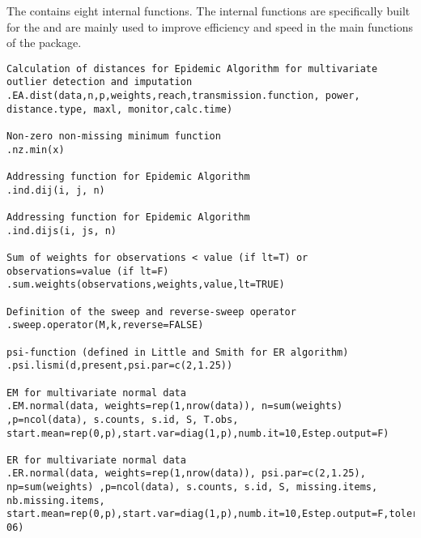 %
\begin{Description}\relax
The  contains eight internal functions. The internal functions are specifically built for the  and are mainly used to improve efficiency and speed in the main functions of the package.
\end{Description}
%
\begin{Usage}
\begin{verbatim}
Calculation of distances for Epidemic Algorithm for multivariate outlier detection and imputation
.EA.dist(data,n,p,weights,reach,transmission.function, power, distance.type, maxl, monitor,calc.time)

Non-zero non-missing minimum function
.nz.min(x)

Addressing function for Epidemic Algorithm
.ind.dij(i, j, n)

Addressing function for Epidemic Algorithm
.ind.dijs(i, js, n)

Sum of weights for observations < value (if lt=T) or observations=value (if lt=F)
.sum.weights(observations,weights,value,lt=TRUE)

Definition of the sweep and reverse-sweep operator
.sweep.operator(M,k,reverse=FALSE) 

psi-function (defined in Little and Smith for ER algorithm)
.psi.lismi(d,present,psi.par=c(2,1.25))

EM for multivariate normal data
.EM.normal(data, weights=rep(1,nrow(data)), n=sum(weights) ,p=ncol(data), s.counts, s.id, S, T.obs, start.mean=rep(0,p),start.var=diag(1,p),numb.it=10,Estep.output=F)

ER for multivariate normal data
.ER.normal(data, weights=rep(1,nrow(data)), psi.par=c(2,1.25), np=sum(weights) ,p=ncol(data), s.counts, s.id, S, missing.items, nb.missing.items, start.mean=rep(0,p),start.var=diag(1,p),numb.it=10,Estep.output=F,tolerance=1e-06)
\end{verbatim}
\end{Usage}
%
